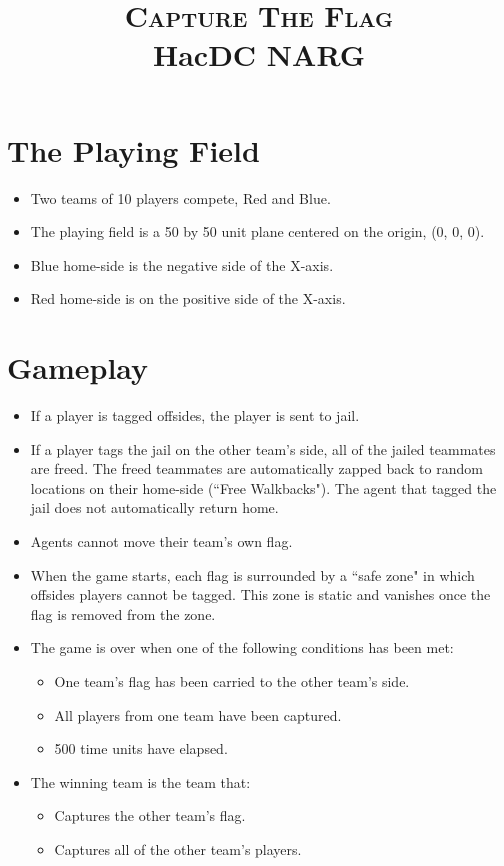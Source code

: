 \documentclass{article}
\begin{document}
\title{\LARGE{\textsc{Capture The Flag}}\\\large{HacDC NARG}}
\maketitle
\section*{The Playing Field}
	\begin{itemize}
		\item Two teams of 10 players compete, Red and Blue.
		\item The playing field is a 50 by 50 unit plane centered on the origin, (0, 0, 0).
		\item Blue home-side is the negative side of the X-axis.
		\item Red home-side is on the positive side of the X-axis.
	\end{itemize}
\section*{Gameplay}
	\begin{itemize}
		\item If a player is tagged offsides, the player is sent to jail.
		\item If a player tags the jail on the other team's side, all of the jailed teammates are freed. The freed teammates are automatically zapped back to random locations on their home-side (``Free Walkbacks"). The agent that tagged the jail does not automatically return home.
		\item Agents cannot move their team's own flag.
		\item When the game starts, each flag is surrounded by a ``safe zone" in which offsides players cannot be tagged. This zone is static and vanishes once the flag is removed from the zone.
		\item The game is over when one of the following conditions has been met:
			\begin{itemize}
				\item One team's flag has been carried to the other team's side.
				\item All players from one team have been captured.
				\item 500 time units have elapsed.
			\end{itemize}
		\item The winning team is the team that:
			\begin{itemize}
				\item Captures the other team's flag.
				\item Captures all of the other team's players.
			\end{itemize}
	\end{itemize}
\end{document}
